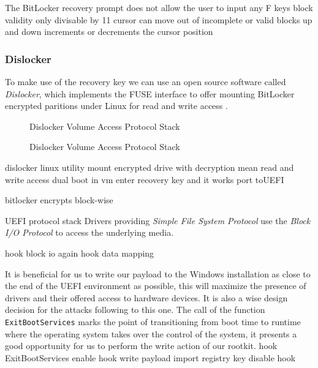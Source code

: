 

The BitLocker recovery prompt does not allow the user to input any
F keys
block validity
only divisable by 11
\cite[9. BitLocker Key Recovery]{windows-internals-6-part2}
cursor can move out of incomplete or valid blocks
up and down increments or decrements the cursor position

\subsubsection{Dislocker}

To make use of the recovery key we can use an open source software called \emph{Dislocker}, which implements the \ac{FUSE} interface to offer mounting BitLocker encrypted paritions under Linux for read and write access \cite{dislocker}.

\begin{figure}[htb]%
    \centering
    
    \caption{Dislocker Volume Access Protocol Stack}%
    \label{fig:dislocker_volume_access_stack}%
\end{figure}

\begin{figure}[htb]%
    \centering
    
    \caption{Dislocker Volume Access Protocol Stack}%
\end{figure}


dislocker linux utility
\cite{dislocker}
mount encrypted drive with decryption mean
read and write access
dual boot in vm
enter recovery key and it works
port to\ac{UEFI}

bitlocker encrypts block-wise

\ac{UEFI} protocol stack
\cite[13.3.2 Partition Disocvery]{uefi-spec}
Drivers providing \emph{Simple File System Protocol} use the \emph{Block I/O Protocol} to access the underlying media.


hook block io
again hook data mapping

It is beneficial for us to write our payload to the Windows installation as close to the end of the \ac{UEFI} environment as possible, this will maximize the presence of drivers and their offered access to hardware devices. It is also a wise design decision for the attacks following to this one. The call of the function \lstinline{ExitBootServices} marks the point of transitioning from boot time to runtime where the operating system takes over the control of the system, it presents a good opportunity for us to perform the write action of our rootkit.
\cite{exitbootservices-hooking}
hook ExitBootServices
enable hook
write payload
import registry key
disable hook

